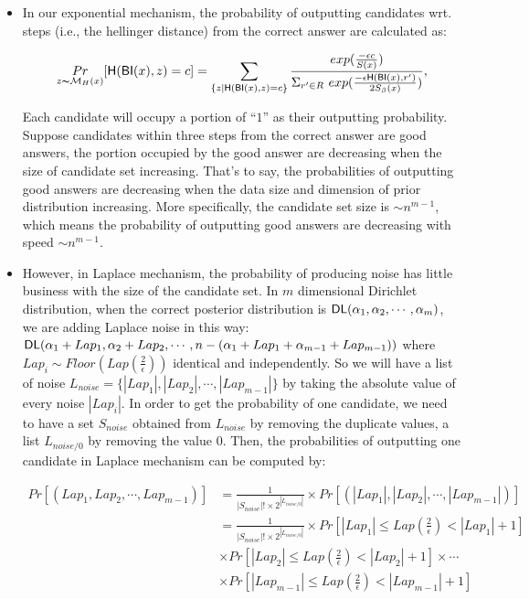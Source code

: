 \begin{itemize}

	\item In our exponential mechanism, the probability of outputting candidates wrt. steps (i.e., the hellinger distance) from the correct answer are calculated as:

	\begin{equation*}
	\underset{z \thicksim \mathcal{M}_H(x)}{Pr}[ \mathsf{H}(\mathsf{BI}(x), z) = c] = \sum\limits_{\{z| \mathsf{H}(\mathsf{BI}(x), z) = c\}}\frac{exp(\frac{- \epsilon c}{S(x)})}
	{\Sigma_{r' \in R}\ exp(\frac{-\epsilon \mathsf{H}(\mathsf{BI}(x),r')}{2 S_\beta(x)})},
	\end{equation*}

	Each candidate will occupy a portion of ``$1$'' as their outputting probability. Suppose candidates within three steps from the correct answer are good answers, the portion occupied by the good answer are decreasing when the size of candidate set increasing. That's to say, the probabilities of outputting good answers are decreasing when the data size and dimension of prior distribution increasing. More specifically, the candidate set size is $\sim n^{m-1}$, which means the probability of outputting good answers are decreasing with speed $\sim n^{m-1}$.

	\item However, in Laplace mechanism, the probability of producing noise has little business with the size of the candidate set. In $m$ dimensional Dirichlet distribution, when the correct posterior distribution is $\mathsf{DL}(\alpha_1, \alpha_2, \cdots, \alpha_m)$, we are adding Laplace noise in this way: $\mathsf{DL}(\alpha_1 + Lap_1, \alpha_2 + Lap_2, \cdots, n - (\alpha_1 + Lap_1 + \alpha_{m-1} + Lap_{m-1}))$ where $Lap_i \sim Floor(Lap(\frac{2}{\epsilon}))$ identical and independently. So we will have a list of noise $L_{noise} = \{|Lap_1|, |Lap_2|,\cdots ,|Lap_{m-1}|\}$ by taking the absolute value of every noise $|Lap_i|$. In order to get the probability of one candidate, we need to have a set $S_{noise}$ obtained from $L_{noise}$ by removing the duplicate values, a list $L_{noise/0}$ by removing the value 0. Then, the probabilities of outputting one candidate in Laplace mechanism can be computed by: 

	\begin{equation*}
	\begin{split}
	Pr[(Lap_1, Lap_2, \cdots, Lap_{m-1})]  
	& = \frac{1}{|S_{noise}|! \times 2^{|L_{noise/0}|}} \times Pr[(|Lap_1|, |Lap_2|, \cdots, |Lap_{m-1}|)] \\
	& = \frac{1}{|S_{noise}|! \times 2^{|L_{noise/0}|}} \times Pr[|Lap_1| \leq Lap(\frac{2}{\epsilon}) < |Lap_1| + 1] \\
	& \times Pr[|Lap_2| \leq Lap(\frac{2}{\epsilon}) < |Lap_2| + 1] \times \cdots \\
	& \times Pr[|Lap_{m-1}| \leq Lap(\frac{2}{\epsilon}) < |Lap_{m-1}| + 1]
	\end{split}
	\end{equation*}


\end{itemize}
